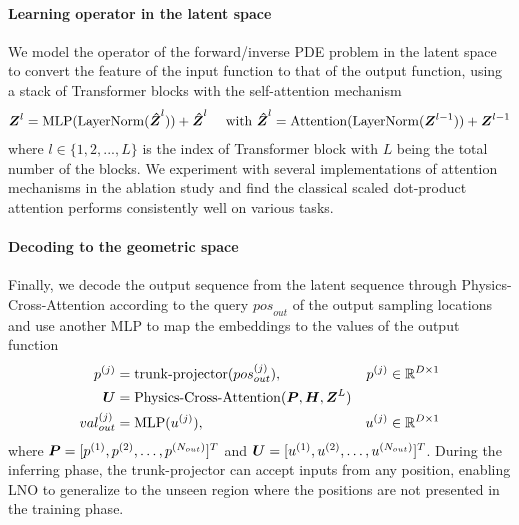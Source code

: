 \documentclass{article}
\begin{document}
\paragraph{Learning operator in the latent space}
We model the operator of the forward/inverse PDE problem in the latent space to convert the feature of the input function to that of the output function, using a stack of Transformer blocks with the self-attention mechanism
\begin{gather}
\boldsymbol{Z}^{l} = {\rm MLP}({\rm LayerNorm}(\boldsymbol{\hat{Z}}^{l})) + \boldsymbol{\hat{Z}}^{l}
\text{ \quad with } \boldsymbol{\hat{Z}}^{l} = {\rm Attention}({\rm LayerNorm}(\boldsymbol{Z}^{l-1})) + \boldsymbol{Z}^{l-1} \nonumber
\end{gather}
where $l\in\{1,2,...,L\}$ is the index of Transformer block with $L$ being the total number of the blocks. We experiment with several implementations of attention mechanisms in the ablation study and find the classical scaled dot-product attention\cite{Attention} performs consistently well on various tasks. 

\paragraph{Decoding to the geometric space}
Finally, we decode the output sequence from the latent sequence through Physics-Cross-Attention according to the query ${pos}_{out}$ of the output sampling locations and use another MLP to map the embeddings to the values of the output function
\begin{equation} \label{eq:decoder}
\begin{aligned}
{p}^{(j)} &= {\rm trunk\text{-}projector}({pos}_{out}^{(j)}), &{p}^{(j)}\in \mathbb{R}^{D \times 1}
\\
\boldsymbol{U}&={\rm Physics\text{-}Cross\text{-}Attention}(\boldsymbol{P}, \boldsymbol{H}, \boldsymbol{Z}^L) 
\\ 
{{val}}_{out}^{(j)}&={\rm MLP}({u}^{(j)}), &{u}^{(j)}\in \mathbb{R}^{D \times 1} 
\end{aligned}
\end{equation}
where $\boldsymbol{P}=[p^{(1)}, p^{(2)},\ldots,p^{(N_{out})}]^T$ and $\boldsymbol{U}=[u^{(1)}, u^{(2)},\ldots,u^{(N_{out})}]^T$. During the inferring phase, the trunk-projector can accept inputs from any position, enabling LNO to generalize to the unseen region where the positions are not presented in the training phase. 
\end{document}
